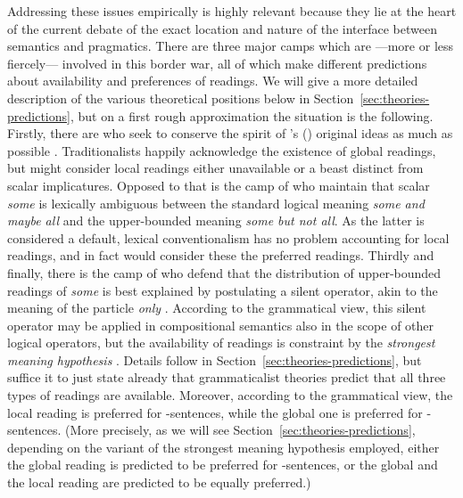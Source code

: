 \documentclass[fleqn,reqno,10pt]{article}
\newcommand{\as}{\acro{as}}
\renewcommand{\es}{\acro{es}}
\newcommand{\mymark}[1]{{\color{mycol}{#1}}}
\begin{document}
Addressing these issues empirically is highly relevant because they
lie at the heart of the current debate of the exact location and
nature of the interface between semantics and pragmatics. There are
three major camps which are ---more or less fiercely--- involved in
this border war, all of which make different predictions about
availability and preferences of readings. We will give a more detailed
description of the various theoretical positions below in
Section~\ref{sec:theories-predictions}, but on a first rough
approximation the situation is the following. Firstly, there are
\mymark{pragmatic traditionalists} who seek to conserve the spirit of
\citeauthor{Grice1975:Logic-and-Conve}'s
(\citeyear{Grice1975:Logic-and-Conve}) original ideas as much as
possible
\citep[e.g.][]{Spector2006:Scalar-Implicat,Sauerland2004:Scalar-Implicat,Russell2006:Against-Grammat,vanRooijSchulz:ExhaustiveInterpretation,Geurts2010:Quantity-Implic,Franke2011:Quantity-Implic}. Traditionalists
happily acknowledge the existence of global readings, but might
consider local readings either unavailable or a beast distinct from
scalar implicatures. Opposed to that is the camp of \mymark{lexical
  conventionalists}
\citep[e.g.][]{LevinsonPresumptiveMeanings2000,Chierchia:2004_ScalarImplicatures}
who maintain that scalar \emph{some} is lexically ambiguous between
the standard logical meaning \emph{some and maybe all} and the
upper-bounded meaning \emph{some but not all}. As the latter is
considered a default, lexical conventionalism has no problem
accounting for local readings, and in fact would consider these the
preferred readings. Thirdly and finally, there is the camp of
\mymark{grammaticalists} who defend that the distribution of
upper-bounded readings of \emph{some} is best explained by postulating
a silent operator, akin to the meaning of the particle \emph{only}
\citep{Chierchia2006:Broaden-Your-Vi,Fox2007:Free-Choice-and,ChierchiaFox2008:The-Grammatical,Chierchia2012:FC-Nominals-and,Sauerland2012:The-Computation}. According
to the grammatical view, this silent operator may be applied in
compositional semantics also in the scope of other logical operators,
but the availability of readings is constraint by the \emph{strongest
  meaning hypothesis}
\citep{DalrympleKanazawa1998:Reciprocal-Expr}. Details follow in
Section~\ref{sec:theories-predictions}, but suffice it to just state
already that grammaticalist theories predict that all three types of
readings are available. Moreover, according to the grammatical view,
the local reading is preferred for \as-sentences, while the global one
is preferred for \es-sentences. (More precisely, as we will see
Section~\ref{sec:theories-predictions}, depending on the variant of
the strongest meaning hypothesis employed, either the global reading
is predicted to be preferred for \es-sentences, or the global and the
local reading are predicted to be equally preferred.)
\end{document}
